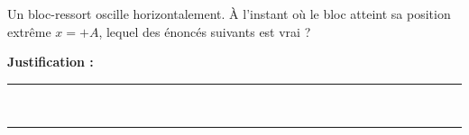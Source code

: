 Un bloc-ressort oscille horizontalement. À l'instant où le bloc atteint sa position extrême $x = +A$, lequel des énoncés suivants est vrai ?

\choices

\noindent\textbf{Justification :} \hrulefill \\[2.5ex]
\rule{\linewidth}{0.4pt} \\[2.5ex]
\rule{\linewidth}{0.4pt}
\vfill
